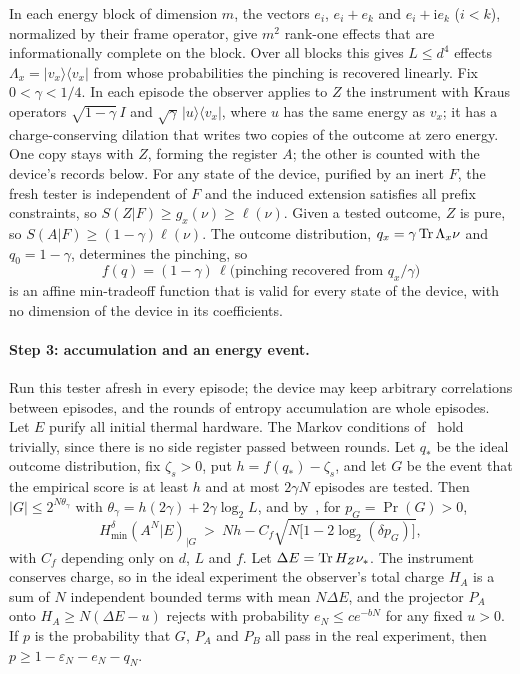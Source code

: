 In each energy block of dimension $m$, the vectors $e_i$, $e_i+e_k$ and $e_i+\mathrm ie_k$ ($i<k$), normalized by their frame operator, give $m^2$ rank-one effects that are informationally complete on the block. Over all blocks this gives $L\le d^4$ effects $\Lambda_x=|v_x\rangle\langle v_x|$ from whose probabilities the pinching is recovered linearly. Fix $0<\gamma<1/4$. In each episode the observer applies to $Z$ the instrument with Kraus operators $\sqrt{1-\gamma}\,I$ and $\sqrt\gamma\,|u\rangle\langle v_x|$, where $u$ has the same energy as $v_x$; it has a charge-conserving dilation that writes two copies of the outcome at zero energy. One copy stays with $Z$, forming the register $A$; the other is counted with the device's records below. For any state of the device, purified by an inert $F$, the fresh tester is independent of $F$ and the induced extension satisfies all prefix constraints, so $S(Z|F)\ge g_x(\nu)\ge\ell(\nu)$. Given a tested outcome, $Z$ is pure, so $S(A|F)\ge(1-\gamma)\ell(\nu)$. The outcome distribution, $q_x=\gamma\operatorname{Tr}\Lambda_x\nu$ and $q_0=1-\gamma$, determines the pinching, so
\[
f(q)=(1-\gamma)\,\ell\bigl(\text{pinching recovered from }q_x/\gamma\bigr)
\]
is an affine min-tradeoff function that is valid for every state of the device, with no dimension of the device in its coefficients.

\paragraph{Step 3: accumulation and an energy event.} Run this tester afresh in every episode; the device may keep arbitrary correlations between episodes, and the rounds of entropy accumulation are whole episodes. Let $E$ purify all initial thermal hardware. The Markov conditions of~\cite{DFR20} hold trivially, since there is no side register passed between rounds. Let $q_*$ be the ideal outcome distribution, fix $\zeta_s>0$, put $h=f(q_*)-\zeta_s$, and let $G$ be the event that the empirical score is at least $h$ and at most $2\gamma N$ episodes are tested. Then $|G|\le2^{N\theta_\gamma}$ with $\theta_\gamma=h(2\gamma)+2\gamma\log_2L$, and by~\cite[Thm.~4.4]{DFR20}, for $p_G=\Pr(G)>0$,
\begin{equation}\label{ar:eq:eat}
H_{\min}^\delta(A^N|E)_{|G}\ >\ Nh-C_f\sqrt{N\bigl[1-2\log_2(\delta p_G)\bigr]},
\end{equation}
with $C_f$ depending only on $d$, $L$ and $f$. Let $\Delta E=\operatorname{Tr} H_Z\nu_*$. The instrument conserves charge, so in the ideal experiment the observer's total charge $H_A$ is a sum of $N$ independent bounded terms with mean $N\Delta E$, and the projector $P_A$ onto $H_A\ge N(\Delta E-u)$ rejects with probability $e_N\le ce^{-bN}$ for any fixed $u>0$. If $p$ is the probability that $G$, $P_A$ and $P_B$ all pass in the real experiment, then $p\ge1-\varepsilon_N-e_N-q_N$.

